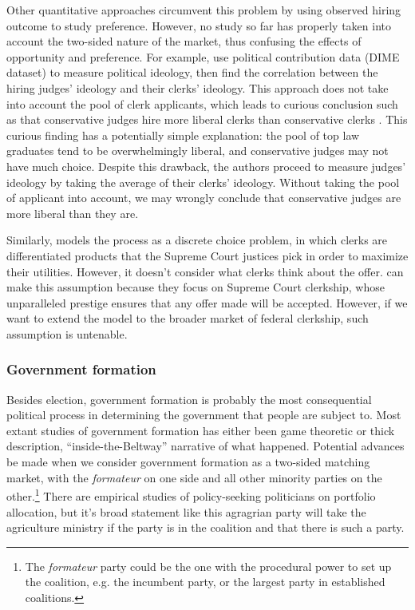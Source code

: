 Other quantitative approaches circumvent this problem by using observed hiring
outcome to study preference. However, no study so far has properly taken into
account the two-sided nature of the market, thus confusing the effects of
opportunity and preference. For example, \citet{Bonica2017} use political
contribution data (DIME dataset) to measure political ideology, then find the
correlation between the hiring judges' ideology and their clerks' ideology. This
approach does not take into account the pool of clerk applicants, which leads to
curious conclusion such as that conservative judges hire more liberal clerks
than conservative clerks \citep[31]{Bonica2017}. This curious finding has a
potentially simple explanation: the pool of top law graduates tend to be
overwhelmingly liberal, and conservative judges may not have much choice.
Despite this drawback, the authors proceed to measure judges' ideology by taking
the average of their clerks' ideology. Without taking the pool of applicant into
account, we may wrongly conclude that conservative judges are more liberal than
they are.

Similarly, \citet{Rozema2016} models the process as a discrete choice problem, in which clerks are
differentiated products that the Supreme Court justices pick in order to
maximize their utilities. However, it doesn't consider what clerks think about
the offer. \citet{Rozema2016} can make this assumption because they focus on
Supreme Court clerkship, whose unparalleled prestige ensures that any offer made
will be accepted. However, if we want to extend the model to the
broader market of federal clerkship, such assumption is untenable.

\subsubsection{Government formation}

Besides election, government formation is probably the most consequential
political process in determining the government that people are subject to. Most
extant studies of government formation has either been game theoretic or thick description, ``inside-the-Beltway''
narrative of what happened. Potential advances be made when we consider
government formation as a two-sided matching market, with the \textit{formateur}
on one side and all other minority parties on the other.\footnote{The
  \textit{formateur} party could be the one with the procedural power to set up
  the coalition, e.g. the incumbent party, or the largest party in established
  coalitions.} There are empirical studies of policy-seeking politicians on portfolio
allocation, but it's broad statement like this agragrian party will take the
agriculture ministry if the party is in the coalition and that there is such a party.

